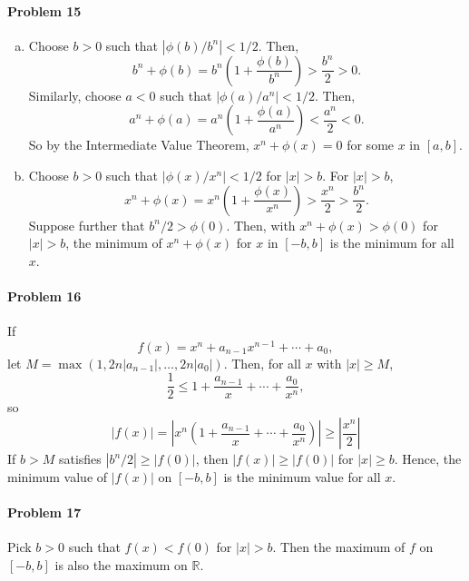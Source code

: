 \documentclass{article}
\begin{document}
\paragraph{Problem 15}
\begin{enumerate}[(a)]
  \item Choose $b > 0$ such that $|\phi(b)/b^n| < 1/2$. Then, \[
    b^n + \phi(b)
    = b^n \left( 1 + \frac{\phi(b)}{b^n} \right)
    > \frac{b^n}{2} > 0.
  \] Similarly, choose $a < 0$ such that $|\phi(a)/a^n| < 1/2$. Then, \[
    a^n + \phi(a)
    = a^n \left( 1 + \frac{\phi(a)}{a^n} \right)
    < \frac{a^n}{2} < 0.
  \] So by the Intermediate Value Theorem, $x^n + \phi(x) = 0$ for some $x$ in
  $[a, b]$.
  \item Choose $b > 0$ such that $|\phi(x)/x^n| < 1/2$ for $|x| > b$. For $|x|
    > b$, \[
      x^n + \phi(x)
      = x^n \left( 1 + \frac{\phi(x)}{x^n} \right)
      > \frac{x^n}{2} > \frac{b^n}{2}.
    \] Suppose further that $b^n/2 > \phi(0)$. Then, with $x^n + \phi(x) >
    \phi(0)$ for $|x| > b$, the minimum of $x^n + \phi(x)$ for $x$ in $[-b, b]$
    is the minimum for all $x$.
\end{enumerate}

\paragraph{Problem 16} If \[
  f(x) = x^n + a_{n-1}x^{n-1} + \cdots + a_0,
\] let $M = \max(1, 2n|a_{n-1}|, \ldots, 2n|a_0|)$. Then, for all $x$ with $|x|
\geq M$, \[
  \frac{1}{2} \leq 1 + \frac{a_{n-1}}{x} + \cdots + \frac{a_0}{x^n},
\] so \[
  |f(x)|
  = \left| x^n \left(
    1 + \frac{a_{n-1}}{x} + \cdots + \frac{a_0}{x^n}
  \right)\right|
  \geq \left| \frac{x^n}{2} \right|
\] If $b > M$ satisfies $|b^n/2| \geq |f(0)|$, then $|f(x)| \geq |f(0)|$ for
$|x| \geq b$. Hence, the minimum value of $|f(x)|$ on $[-b, b]$ is the minimum
value for all $x$.

\paragraph{Problem 17} Pick $b > 0$ such that $f(x) < f(0)$ for $|x| > b$. Then
the maximum of $f$ on $[-b, b]$ is also the maximum on $\mathbb{R}$.
\end{document}
